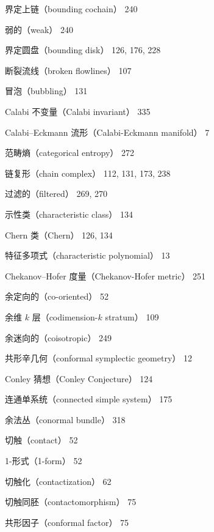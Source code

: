{\noindent 界定上链（bounding cochain） 240\par
\noindent\hspace*{1.5em}弱的（weak） 240\par
\noindent 界定圆盘（bounding disk） 126, 176, 228\par
\noindent 断裂流线（broken flowlines） 107\par
\noindent 冒泡（bubbling） 131\par
\noindent Calabi 不变量（Calabi invariant） 335\par
\noindent Calabi–Eckmann 流形（Calabi-Eckmann manifold） 7\par
\noindent 范畴熵（categorical entropy） 272\par
\noindent 链复形（chain complex） 112, 131, 173, 238\par
\noindent\hspace*{1.5em}过滤的（filtered） 269, 270\par
\noindent 示性类（characteristic class） 134\par
\noindent\hspace*{1.5em}Chern 类（Chern） 126, 134\par
\noindent 特征多项式（characteristic polynomial） 13\par
\noindent Chekanov–Hofer 度量（Chekanov-Hofer metric） 251\par
\noindent 余定向的（co-oriented） 52\par
\noindent 余维 $k$ 层（codimension-$k$ stratum） 109\par
\noindent 余迷向的（coisotropic） 249\par
\noindent 共形辛几何（conformal symplectic geometry） 12\par
\noindent Conley 猜想（Conley Conjecture） 124\par
\noindent 连通单系统（connected simple system） 175\par
\noindent 余法丛（conormal bundle） 318\par
\noindent 切触（contact） 52\par
\noindent\hspace*{1.5em}1-形式（1-form） 52\par
\noindent\hspace*{1.5em}切触化（contactization） 62\par
\noindent\hspace*{1.5em}切触同胚（contactomorphism） 75\par
\noindent\hspace*{3em}共形因子（conformal factor） 75\par
}
